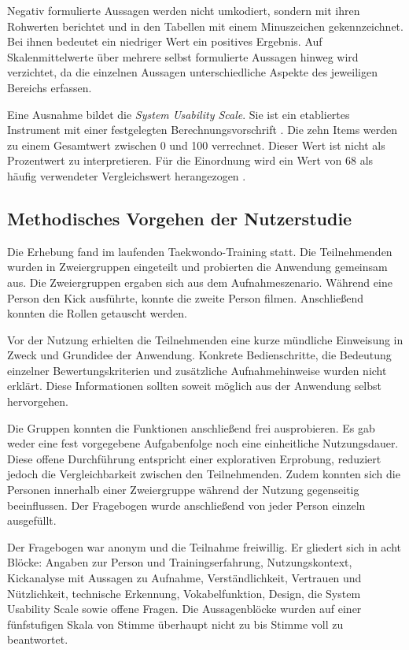 \documentclass[intern]{cgMA}
\begin{document}
Negativ formulierte Aussagen werden nicht umkodiert, sondern mit ihren Rohwerten berichtet und in den Tabellen mit einem Minuszeichen gekennzeichnet. Bei ihnen bedeutet ein niedriger Wert ein positives Ergebnis. Auf Skalenmittelwerte über mehrere selbst formulierte Aussagen hinweg wird verzichtet, da die einzelnen Aussagen unterschiedliche Aspekte des jeweiligen Bereichs erfassen.

Eine Ausnahme bildet die \textit{System Usability Scale}. Sie ist ein etabliertes Instrument mit einer festgelegten Berechnungsvorschrift \cite{Brooke1996}. Die zehn Items werden zu einem Gesamtwert zwischen 0 und 100 verrechnet. Dieser Wert ist nicht als Prozentwert zu interpretieren. Für die Einordnung wird ein Wert von 68 als häufig verwendeter Vergleichswert herangezogen \cite{SauroLewis2016}.

\subsection{Methodisches Vorgehen der Nutzerstudie}
\label{sec:eval_methode}
Die Erhebung fand im laufenden Taekwondo-Training statt. Die Teilnehmenden wurden in Zweiergruppen eingeteilt und probierten die Anwendung gemeinsam aus. Die Zweiergruppen ergaben sich aus dem Aufnahmeszenario. Während eine Person den Kick ausführte, konnte die zweite Person filmen. Anschließend konnten die Rollen getauscht werden.

Vor der Nutzung erhielten die Teilnehmenden eine kurze mündliche Einweisung in Zweck und Grundidee der Anwendung. Konkrete Bedienschritte, die Bedeutung einzelner Bewertungskriterien und zusätzliche Aufnahmehinweise wurden nicht erklärt. Diese Informationen sollten soweit möglich aus der Anwendung selbst hervorgehen.

Die Gruppen konnten die Funktionen anschließend frei ausprobieren. Es gab weder eine fest vorgegebene Aufgabenfolge noch eine einheitliche Nutzungsdauer. Diese offene Durchführung entspricht einer explorativen Erprobung, reduziert jedoch die Vergleichbarkeit zwischen den Teilnehmenden. Zudem konnten sich die Personen innerhalb einer Zweiergruppe während der Nutzung gegenseitig beeinflussen. Der Fragebogen wurde anschließend von jeder Person einzeln ausgefüllt.

Der Fragebogen war anonym und die Teilnahme freiwillig. Er gliedert sich in acht Blöcke: Angaben zur Person und Trainingserfahrung, Nutzungskontext, Kickanalyse mit Aussagen zu Aufnahme, Verständlichkeit, Vertrauen und Nützlichkeit, technische Erkennung, Vokabelfunktion, Design, die System Usability Scale sowie offene Fragen. Die Aussagenblöcke wurden auf einer fünfstufigen Skala von \glqq{}Stimme überhaupt nicht zu\grqq{} bis \glqq{}Stimme voll zu\grqq{} beantwortet.
\end{document}
